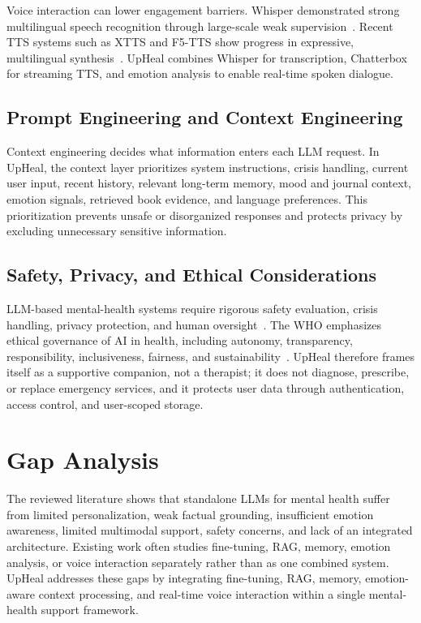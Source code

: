 \documentclass[12pt,a4paper,oneside,openany]{report}
\begin{document}
Voice interaction can lower engagement barriers. Whisper demonstrated strong multilingual speech recognition through large-scale weak supervision~\cite{radford2022whisper}. Recent TTS systems such as XTTS and F5-TTS show progress in expressive, multilingual synthesis~\cite{casanova2024xtts,chen2024f5tts}. UpHeal combines Whisper for transcription, Chatterbox for streaming TTS, and emotion analysis to enable real-time spoken dialogue.

\subsection{Prompt Engineering and Context Engineering}

Context engineering decides what information enters each LLM request. In UpHeal, the context layer prioritizes system instructions, crisis handling, current user input, recent history, relevant long-term memory, mood and journal context, emotion signals, retrieved book evidence, and language preferences. This prioritization prevents unsafe or disorganized responses and protects privacy by excluding unnecessary sensitive information.

\subsection{Safety, Privacy, and Ethical Considerations}

LLM-based mental-health systems require rigorous safety evaluation, crisis handling, privacy protection, and human oversight~\cite{guo2024llmmentalhealth,hua2024llmmentalhealthscoping}. The WHO emphasizes ethical governance of AI in health, including autonomy, transparency, responsibility, inclusiveness, fairness, and sustainability~\cite{who2021aiethics}. UpHeal therefore frames itself as a supportive companion, not a therapist; it does not diagnose, prescribe, or replace emergency services, and it protects user data through authentication, access control, and user-scoped storage.

\section{Gap Analysis}

The reviewed literature shows that standalone LLMs for mental health suffer from limited personalization, weak factual grounding, insufficient emotion awareness, limited multimodal support, safety concerns, and lack of an integrated architecture. Existing work often studies fine-tuning, RAG, memory, emotion analysis, or voice interaction separately rather than as one combined system. UpHeal addresses these gaps by integrating fine-tuning, RAG, memory, emotion-aware context processing, and real-time voice interaction within a single mental-health support framework.
\end{document}
